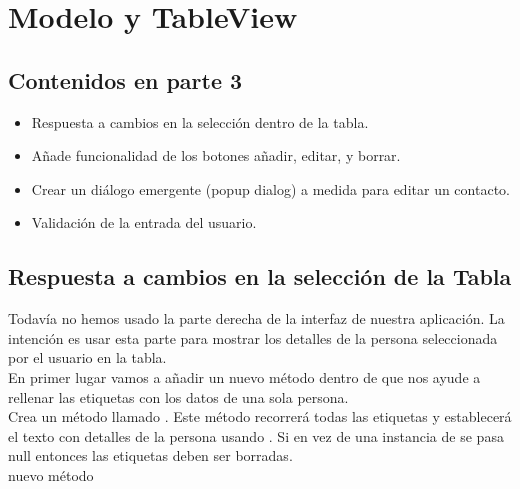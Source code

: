 \chapter{Modelo y TableView}

\section{Contenidos en parte 3}
\begin{itemize}
    \item Respuesta a cambios en la selección dentro de la tabla.
    \item Añade funcionalidad de los botones añadir, editar, y borrar.
    \item Crear un diálogo emergente (popup dialog) a medida para editar un contacto.
    \item Validación de la entrada del usuario.
\end{itemize}

\section{Respuesta a cambios en la selección de la Tabla}
Todavía no hemos usado la parte derecha de la interfaz de nuestra aplicación. 
La intención es usar esta parte para mostrar los detalles de la persona seleccionada por 
el usuario en la tabla. \\
En primer lugar vamos a añadir un nuevo método dentro de  que nos ayude a 
rellenar las etiquetas con los datos de una sola persona. \\

Crea un método llamado . Este método recorrerá todas las etiquetas y 
establecerá el texto con detalles de la persona usando . Si en vez de una instancia de 
 se pasa null entonces las etiquetas deben ser borradas. \\
 nuevo método 

